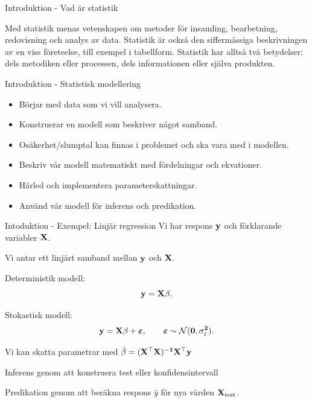 \documentclass[10pt,english]{beamer}
\begin{document}
\begin{frame}{Introduktion - Vad är statistik}
    \begin{bluebox}
        Med statistik menas vetenskapen om metoder för insamling, bearbetning, redovisning och analys av data. Statistik är också den siffermässiga beskrivningen av en viss företeelse, till exempel i tabellform. Statistik har alltså två betydelser: dels metodiken eller processen, dels informationen eller själva produkten.
    \end{bluebox}
\end{frame}

\begin{frame}{Introduktion - Statistisk modellering}
    \begin{itemize}
        \item Börjar med data som vi vill analysera.
        \item Konstruerar en modell som beskriver något samband.
        \item Osäkerhet/slumptal kan finnas i problemet och ska vara med i modellen.
        \item Beskriv vår modell matematiskt med fördelningar och ekvationer.
        \item Härled och implementera parameterskattningar.
        \item Använd vår modell för inferens och predikation.
    \end{itemize}
\end{frame}

\begin{frame}{Intoduktion - Exempel: Linjär regression}
    Vi har respons $\bf{y}$ och förklarande variabler $\bf{X}$.

    Vi antar ett linjärt samband mellan $\bf{y}$ och $\bf{X}$.

    Deterministik modell:
    \begin{equation*}
        \bf{y} = \bf{X} \beta.
    \end{equation*}

    Stokastisk modell:
    \begin{equation*}
        \bf{y} = \bf{X} \beta + \boldsymbol{\varepsilon}, \qquad \boldsymbol{\varepsilon} \sim \mathcal{N}(0, \sigma^2_{\varepsilon}).
    \end{equation*}

    Vi kan skatta parametrar med $\hat{\beta} = (\bf{X}^\top \bf{X})^{-1}\bf{X}^{\top} \bf{y}$

    Inferens genom att konstruera test eller konfidensintervall

    Predikation genom att beräkna respons $\hat{y}$ för nya värden $\bf{X}_{\text{test}}$.
\end{frame}
\end{document}
